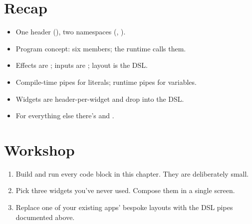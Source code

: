 \section{Recap}

\begin{recap}
\begin{itemize}[leftmargin=*]
  \item One header (), two namespaces
    (, ).
  \item Program concept: six members; the runtime calls them.
  \item Effects are ; inputs are
    ; layout is the DSL.
  \item Compile-time pipes for literals; runtime pipes for
    variables.
  \item Widgets are header-per-widget and drop into the DSL.
  \item For everything else there's  and
    .
\end{itemize}
\end{recap}

\section*{Workshop}

\begin{enumerate}[leftmargin=*]
  \item Build and run every code block in this chapter. They
    are deliberately small.
  \item Pick three widgets you've never used. Compose them
    in a single screen.
  \item Replace one of your existing apps' bespoke layouts
    with the DSL pipes documented above.
\end{enumerate}
